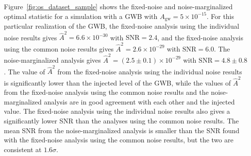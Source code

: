 \documentclass[twocolumn,aps,prd,superscriptaddress]{revtex4-1}
\newcommand{\Agw}{\ensuremath{A_\mathrm{gw}}}
\begin{document}

Figure~\ref{fig:os_dataset_sample} shows the fixed-noise and noise-marginalized 
optimal statistic for a simulation with a GWB with $\Agw=5\times10^{-15}$. 
For this particular realization of the GWB, 
the fixed-noise analysis 
using the individual noise results gives 
$\hat{A}^2 = 6.6\times10^{-30}$ with $\mathrm{SNR} = 2.4$, 
and the fixed-noise analysis using the common noise results gives 
$\hat{A}^2 = 2.6\times10^{-29}$ with $\mathrm{SNR} = 6.0$. 
The noise-marginalized analysis gives $\hat{A}^2 = (2.5 \pm 0.1)\times10^{-29}$ 
with $\mathrm{SNR}=4.8\pm0.8$. 
The value of $\hat{A}^2$ from the fixed-noise analysis using the individual noise results 
is significantly lower than the injected level of the GWB, while 
the values of $\hat{A}^2$ from the fixed-noise analysis using the common noise results 
and the noise-marginalized analysis are in good agreement with each other and the injected value. 
The fixed-noise analysis using the individual noise results also gives a significantly lower SNR 
than the analyses using the common noise results. 
The mean SNR from the noise-marginalized analysis is smaller 
than the SNR found with the fixed-noise analysis using the common noise results, 
but the two are consistent at $1.6\sigma$.
\end{document}
